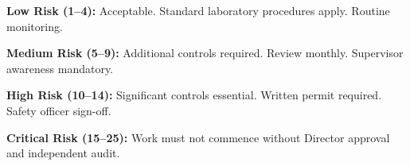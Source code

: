 \vspace{6pt}

\noindent
\begin{minipage}[t]{0.48\linewidth}
  \begin{tcolorbox}[
    colback=SageGreen!30, colframe=SageGreen, boxrule=0.8pt,
    arc=3pt, left=6pt, top=3pt, bottom=3pt
  ]
    \textbf{\textcolor{SageGreen!80!black}{Low Risk (1--4):}} Acceptable.
    Standard laboratory procedures apply. Routine monitoring.
  \end{tcolorbox}
\end{minipage}%
\hfill
\begin{minipage}[t]{0.48\linewidth}
  \begin{tcolorbox}[
    colback=MidAmber!30, colframe=MidAmber, boxrule=0.8pt,
    arc=3pt, left=6pt, top=3pt, bottom=3pt
  ]
    \textbf{\textcolor{AmberAlert!80!black}{Medium Risk (5--9):}} Additional
    controls required. Review monthly. Supervisor awareness mandatory.
  \end{tcolorbox}
\end{minipage}

\par
\vspace{4pt}

\noindent
\begin{minipage}[t]{0.48\linewidth}
  \begin{tcolorbox}[
    colback=AmberAlert!25, colframe=AmberAlert, boxrule=0.8pt,
    arc=3pt, left=6pt, top=3pt, bottom=3pt
  ]
    \textbf{\textcolor{AmberAlert!90!black}{High Risk (10--14):}} Significant
    controls essential. Written permit required. Safety officer sign-off.
  \end{tcolorbox}
\end{minipage}%
\hfill
\begin{minipage}[t]{0.48\linewidth}
  \begin{tcolorbox}[
    colback=DangerRed!25, colframe=DangerRed, boxrule=0.8pt,
    arc=3pt, left=6pt, top=3pt, bottom=3pt
  ]
    \textbf{\textcolor{DangerRed}{Critical Risk (15--25):}} Work must not
    commence without Director approval and independent audit.
  \end{tcolorbox}
\end{minipage}

\vspace{10pt}


